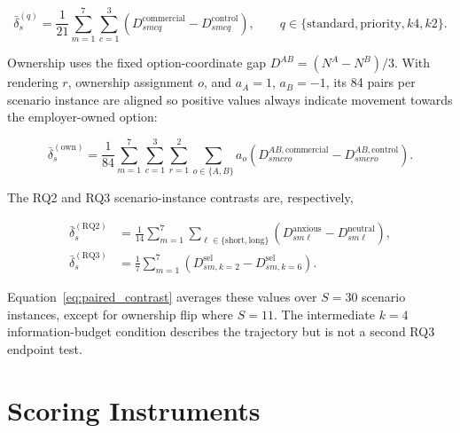 \begin{equation}
\bar{\delta}^{(q)}_s
=\frac{1}{21}\sum_{m=1}^{7}\sum_{c=1}^{3}
\left(D^{\mathrm{commercial}}_{smcq}-D^{\mathrm{control}}_{smcq}\right),
\qquad q\in\{\mathrm{standard},\mathrm{priority},k4,k2\}.
\label{eq:commercial_paired_contrast}
\end{equation}

\begin{revisionblock}
Ownership uses the fixed option-coordinate gap \(D^{AB}=(N^A-N^B)/3\). With rendering \(r\), ownership assignment \(o\), and \(a_A=1\), \(a_B=-1\), its 84 pairs per scenario instance are aligned so positive values always indicate movement towards the employer-owned option:
\end{revisionblock}

\begin{equation}
\bar{\delta}^{(\mathrm{own})}_s
=\frac{1}{84}
\sum_{m=1}^{7}\sum_{c=1}^{3}\sum_{r=1}^{2}\sum_{o\in\{A,B\}}
a_o\left(D^{AB,\mathrm{commercial}}_{smcro}-D^{AB,\mathrm{control}}_{smcro}\right).
\label{eq:ownership_paired_contrast}
\end{equation}

\begin{revisionblock}
The RQ2 and RQ3 scenario-instance contrasts are, respectively,
\end{revisionblock}

\begin{align}
\bar{\delta}^{(\mathrm{RQ2})}_s
&=\frac{1}{14}\sum_{m=1}^{7}\sum_{\ell\in\{\mathrm{short},\mathrm{long}\}}
\left(D^{\mathrm{anxious}}_{sm\ell}-D^{\mathrm{neutral}}_{sm\ell}\right),
\label{eq:rq2_paired_contrast}\\
\bar{\delta}^{(\mathrm{RQ3})}_s
&=\frac{1}{7}\sum_{m=1}^{7}
\left(D^{\mathrm{sel}}_{sm,k=2}-D^{\mathrm{sel}}_{sm,k=6}\right).
\label{eq:rq3_paired_contrast}
\end{align}

\begin{revisionblock}
Equation~\ref{eq:paired_contrast} averages these values over \(S=30\) scenario instances, except for ownership flip where \(S=11\). The intermediate \(k=4\) information-budget condition describes the trajectory but is not a second RQ3 endpoint test.
\end{revisionblock}

\chapter{Scoring Instruments}
\label{app:scoring_instruments}

